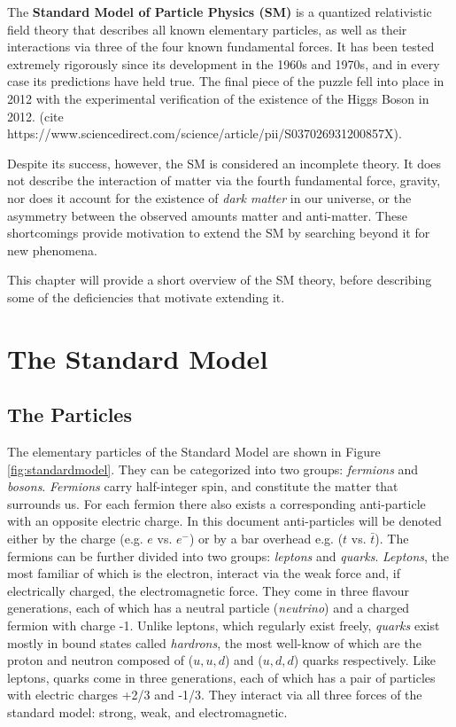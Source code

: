 \label{chapter:theory}

\newlength{\savedunitlength}
\setlength{\unitlength}{2em}

The \textbf{Standard Model of Particle Physics (SM)} is a quantized relativistic field theory that describes all known elementary particles, as well as their interactions via three of the four known fundamental forces. It has been tested extremely rigorously since its development in the 1960s and 1970s, and in every case its predictions have held true. The final piece of the puzzle fell into place in 2012 with the experimental verification of the existence of the Higgs Boson in 2012. (cite https://www.sciencedirect.com/science/article/pii/S037026931200857X).

Despite its success, however, the SM is considered an incomplete theory. It does not describe the interaction of matter via the fourth fundamental force, gravity, nor does it account for the existence of \textit{dark matter} in our universe, or the asymmetry between the observed amounts matter and anti-matter. These shortcomings provide motivation to extend the SM by searching beyond it for new phenomena.

This chapter will provide a short overview of the SM theory, before describing some of the deficiencies that motivate extending it.

\section{The Standard Model}

\subsection{The Particles}
The elementary particles of the Standard Model are shown in Figure \ref{fig:standardmodel}. They can be categorized into two groups: \textit{fermions} and \textit{bosons}. \textit{Fermions} carry half-integer spin, and constitute the matter that surrounds us. For each fermion there also exists a corresponding anti-particle with an opposite electric charge. In this document anti-particles will be denoted either by the charge (e.g. $e$ vs. $e^{-}$) or by a bar overhead e.g. ($t$ vs. $\bar{t}$). The fermions can be further divided into two groups: \textit{leptons} and \textit{quarks}. \textit{Leptons}, the most familiar of which is the electron, interact via the weak force and, if electrically charged, the electromagnetic force. They come in three flavour generations, each of which has a neutral particle (\textit{neutrino}) and a charged fermion with charge -1. Unlike leptons, which regularly exist freely, \textit{quarks} exist mostly in bound states called \textit{hardrons}, the most well-know of which are the proton and neutron composed of ($u,u,d$) and ($u,d,d$) quarks respectively. Like leptons, quarks come in three generations, each of which has a pair of particles with electric charges +2/3 and -1/3. They interact via all three forces of the standard model: strong, weak, and electromagnetic.

